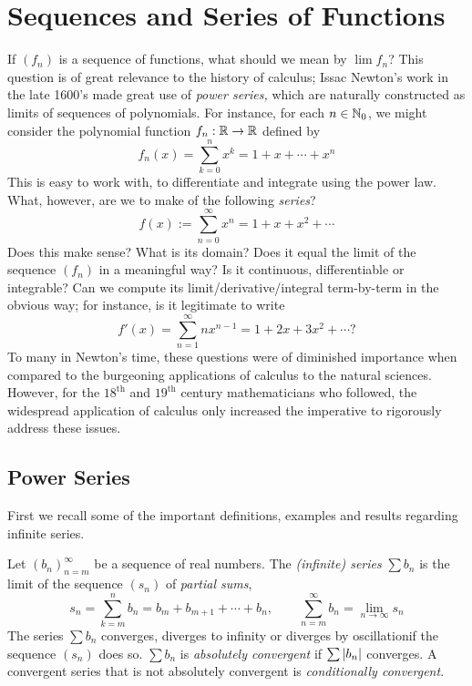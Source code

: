 \graphicspath{{2series/asy/}}

\section{Sequences and Series of Functions}

If $(f_n)$ is a sequence of functions, what should we mean by $\lim f_n$? This question is of great relevance to the history of calculus; Issac Newton's work in the late 1600's made great use of \emph{power series,} which are naturally constructed as limits of sequences of polynomials.\medbreak
For instance, for each $n\in\mathbb{N}_0$, we might consider the polynomial function $f_n:\mathbb{R}\to\mathbb{R}$ defined by
\[f_n(x)=\sum_{k=0}^nx^k=1+x+\cdots+x^n\]
This is easy to work with, to differentiate and integrate using the power law.
What, however, are we to make of the following \emph{series}?
\[f(x):=\sum_{n=0}^\infty x^n=1+x+x^2+\cdots\]
Does this make sense? What is its domain? Does it equal the limit of the sequence $(f_n)$ in a meaningful way? Is it continuous, differentiable or integrable? Can we compute its limit/derivative/integral term-by-term in the obvious way; for instance, is it legitimate to write
\[f'(x)=\sum_{n=1}^\infty nx^{n-1}=1+2x+3x^2+\cdots\text{?}\]
To many in Newton's time, these questions were of diminished importance when compared to the burgeoning applications of calculus to the natural sciences. However, for the $18^\text{th}$ and $19^\text{th}$ century mathematicians who followed, the widespread application of calculus only increased the imperative to rigorously address these issues. 

\setcounter{subsection}{22}
\subsection{Power Series}

First we recall some of the important definitions, examples and results regarding infinite series.

\begin{defn}{}{}
Let $(b_n)_{n=m}^\infty$ be a sequence of real numbers. The \emph{(infinite) series} $\sum b_n$ is the limit of the sequence $(s_n)$ of \emph{partial sums},
\[s_n=\sum_{k=m}^nb_n=b_m+b_{m+1}+\cdots+b_n,\qquad \sum_{n=m}^\infty b_n=\lim_{n\to\infty}s_n\]
The series $\sum b_n$ converges, diverges to infinity or diverges by oscillation\footnotemark if the sequence $(s_n)$ does so.\smallbreak
$\sum b_n$ is \emph{absolutely convergent} if $\sum\left| b_n\right|$ converges. A convergent series that is not absolutely convergent is \emph{conditionally convergent}.
\end{defn}

